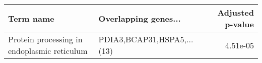 \begin{tabular}{llr}
\toprule
                                  Term name &       Overlapping genes... &  Adjusted p-value \\
\midrule
Protein processing in endoplasmic reticulum & PDIA3,BCAP31,HSPA5,...(13) &          4.51e-05 \\
\bottomrule
\end{tabular}

